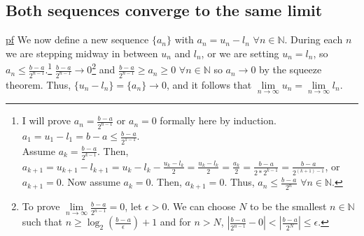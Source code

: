 \documentclass[11pt]{article} %
\begin{document}
\subsection{Both sequences converge to the same limit}
\underline{pf} We now define a new sequence $\{ a_n \}$ with $a_n = u_n - l_n$ $\forall n \in \mathbb{N}$. During each $n$ we are stepping midway in between $u_n$ and $l_n$, or we are setting $u_n = l_n$, so $a_n \leq \frac{b - a}{2^{n-1}}$.\footnote{I will prove $a_n = \frac{b-a}{2^{n-1}}$ or $a_n = 0$ formally here by induction.  $a_1 = u_1 - l_1 = b - a \leq \frac{b-a}{2^{1-1}}$. \\ Assume $a_k = \frac{b-a}{2^{k-1}}$. Then, $a_{k+1} = u_{k+1} - l_{k+1} = u_k - l_k - \frac{u_k - l_k}{2} = \frac{u_k - l_k}{2} = \frac{a_k}{2} = \frac{b-a}{2*2^{k-1}} = \frac{b-a}{2^{(k+1)-1}}$, or $a_{k+1} = 0$. Now assume $a_k = 0$. Then, $a_{k+1} = 0$. Thus, $a_n \leq \frac{b-a}{2^n}$ $\forall n \in \mathbb{N}$.}  $ \frac{b - a}{2^{n-1}} \rightarrow 0$\footnote{To prove $\lim\limits_{n \rightarrow \infty}\frac{b-a}{2^{n-1}} = 0$, let $\epsilon > 0$. We can choose $N$ to be the smallest $n \in \mathbb{N}$ such that $n \geq \log_{2} \left( \frac{b-a}{\epsilon}\right)+1$ and for $n>N$, $|\frac{b-a}{2^{n - 1}} - 0 | < |\frac{b-a}{2^{N}}| \leq \epsilon$. } and $\frac{b - a}{2^{n-1}} \geq a_n \geq 0$ $\forall n \in \mathbb{N}$ so $a_n \rightarrow 0$ by the squeeze theorem. Thus, $\{ u_n - l_n \} = \{a_n \} \rightarrow 0$, and it follows that $\lim\limits_{n \rightarrow \infty}u_n = \lim\limits_{n \rightarrow \infty}l_n $.
\end{document}
